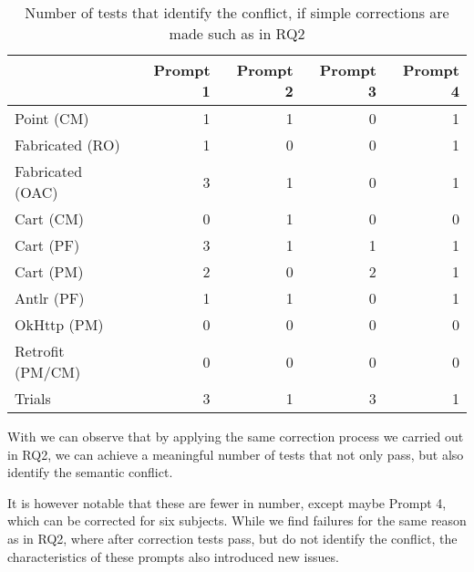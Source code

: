 \begin{table}[t]
    \centering
    \begin{tabular}{@{\extracolsep{\fill}} lrrrr} \toprule
                     & Prompt 1 & Prompt 2 & Prompt 3 & Prompt 4 \\
    \midrule
    Point (CM)       & 1 & 1 & 0 & 1 \\
    Fabricated (RO)  & 1 & 0 & 0 & 1 \\
    Fabricated (OAC) & 3 & 1 & 0 & 1 \\
    Cart (CM)        & 0 & 1 & 0 & 0 \\
    Cart (PF)        & 3 & 1 & 1 & 1 \\
    Cart (PM)        & 2 & 0 & 2 & 1 \\
    Antlr (PF)       & 1 & 1 & 0 & 1 \\
    OkHttp (PM)      & 0 & 0 & 0 & 0 \\
    Retrofit (PM/CM) & 0 & 0 & 0 & 0 \\
    Trials           & 3 & 1 & 3 & 1 \\
    \bottomrule
    \end{tabular}
    \caption{Number of tests that identify the conflict, if simple corrections are made such as in RQ2\label{tab:results:rq3t2}}
\end{table}

With  we can observe that by applying the same correction process we carried out in
RQ2, we can achieve a meaningful number of tests that not only pass, but also identify the semantic conflict.

It is however notable that these are fewer in number, except maybe Prompt 4, which can be corrected for six subjects.
While we find failures for the same reason as in RQ2, where after correction tests pass, but do not identify the conflict,
the characteristics of these prompts also introduced new issues.

